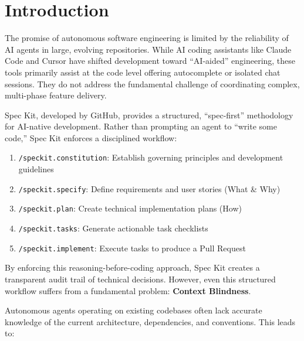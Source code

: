 \documentclass[sigconf,anonymous,review]{acmart}
\begin{document}

\maketitle

\section{Introduction}
The promise of autonomous software engineering is limited by the reliability of AI agents in large, evolving repositories. While AI coding assistants like Claude Code and Cursor have shifted development toward ``AI-aided'' engineering, these tools primarily assist at the code level offering autocomplete or isolated chat sessions. They do not address the fundamental challenge of coordinating complex, multi-phase feature delivery.

Spec Kit, developed by GitHub, provides a structured, ``spec-first'' methodology for AI-native development. Rather than prompting an agent to ``write some code,'' Spec Kit enforces a disciplined workflow:

\begin{enumerate}
  \item \texttt{/speckit.constitution}: Establish governing principles and development guidelines
  \item \texttt{/speckit.specify}: Define requirements and user stories (What \& Why)
  \item \texttt{/speckit.plan}: Create technical implementation plans (How)
  \item \texttt{/speckit.tasks}: Generate actionable task checklists
  \item \texttt{/speckit.implement}: Execute tasks to produce a Pull Request
\end{enumerate}

By enforcing this reasoning-before-coding approach, Spec Kit creates a transparent audit trail of technical decisions. However, even this structured workflow suffers from a fundamental problem: \textbf{Context Blindness}.

Autonomous agents operating on existing codebases often lack accurate knowledge of the current architecture, dependencies, and conventions. This leads to:
\end{document}

